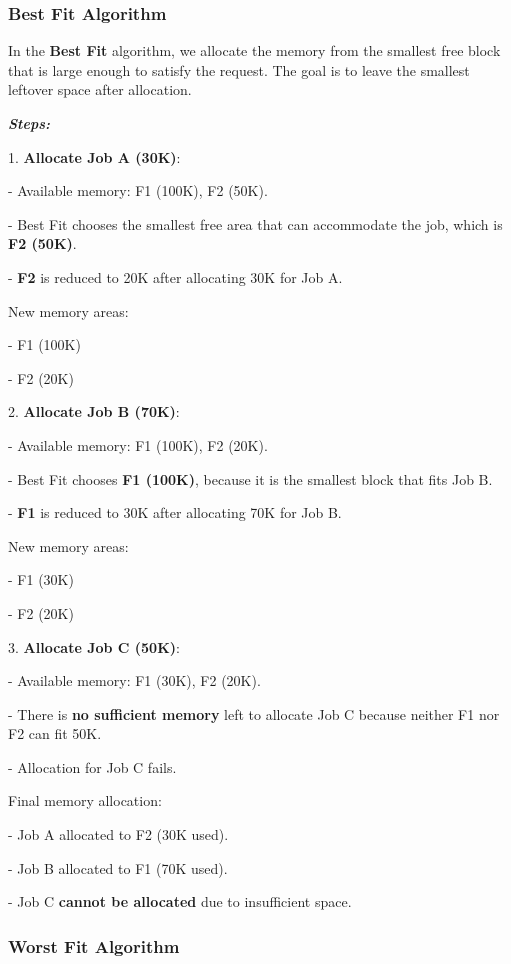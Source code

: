 \documentclass[a4paper]{book}
\begin{document}
\subsubsection{Best Fit Algorithm}

In the \textbf{Best Fit} algorithm, we allocate the memory from the smallest free block that is large enough to satisfy the request. The goal is to leave the smallest leftover space after allocation.

\textit{\textbf{Steps:}}

1. \textbf{Allocate Job A (30K)}:

   - Available memory: F1 (100K), F2 (50K).
   
   - Best Fit chooses the smallest free area that can accommodate the job, which is \textbf{F2 (50K)}.
   
   - \textbf{F2} is reduced to 20K after allocating 30K for Job A.

   New memory areas:
   
   - F1 (100K)
   
   - F2 (20K)

2. \textbf{Allocate Job B (70K)}:

   - Available memory: F1 (100K), F2 (20K).
   
   - Best Fit chooses \textbf{F1 (100K)}, because it is the smallest block that fits Job B.
   
   - \textbf{F1} is reduced to 30K after allocating 70K for Job B.

   New memory areas:
   
   - F1 (30K)
   
   - F2 (20K)

3. \textbf{Allocate Job C (50K)}:

   - Available memory: F1 (30K), F2 (20K).
   
   - There is \textbf{no sufficient memory} left to allocate Job C because neither F1 nor F2 can fit 50K.
   
   - Allocation for Job C fails.

   Final memory allocation:
   
   - Job A allocated to F2 (30K used).
   
   - Job B allocated to F1 (70K used).
   
   - Job C \textbf{cannot be allocated} due to insufficient space.

\subsubsection{Worst Fit Algorithm}
\end{document}
